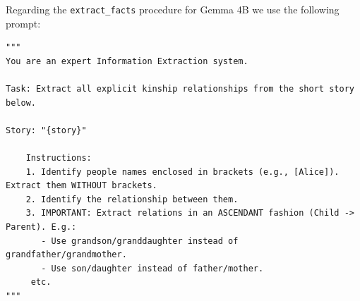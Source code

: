 \documentclass[
]{ceurart}
\begin{document}
\noindent Regarding the \texttt{extract\_facts} procedure for Gemma 4B we use the following prompt:

\begin{lstlisting}[style=mystyle]
"""    
You are an expert Information Extraction system.

Task: Extract all explicit kinship relationships from the short story below.
    
Story: "{story}"
    
    Instructions:
    1. Identify people names enclosed in brackets (e.g., [Alice]). Extract them WITHOUT brackets.
    2. Identify the relationship between them.
    3. IMPORTANT: Extract relations in an ASCENDANT fashion (Child -> Parent). E.g.: 
       - Use grandson/granddaughter instead of grandfather/grandmother.
       - Use son/daughter instead of father/mother.
     etc.
"""
\end{lstlisting}
\end{document}
